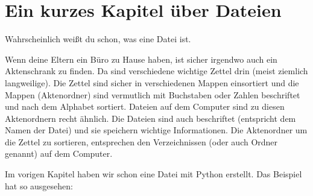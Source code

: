 

\chapter{Ein kurzes Kapitel über Dateien}\label{ch:ashortchapteraboutfiles}

Wahrscheinlich weißt du schon, was eine Datei ist.
\par
\noindent
Wenn deine Eltern ein Büro zu Hause haben, ist sicher irgendwo auch ein Aktenschrank zu finden. Da sind verschiedene wichtige Zettel drin (meist ziemlich langweilige). Die Zettel sind sicher in verschiedenen Mappen einsortiert und die Mappen (Aktenordner) sind vermutlich mit Buchstaben oder Zahlen beschriftet und nach dem Alphabet sortiert. Dateien auf dem Computer sind zu diesen Aktenordnern recht ähnlich. Die Dateien sind auch beschriftet (entspricht dem Namen der Datei) und sie speichern wichtige Informationen. Die Aktenordner um die Zettel zu sortieren, entsprechen den Verzeichnissen (oder auch Ordner genannt) auf dem Computer.
\par
Im vorigen Kapitel haben wir schon eine Datei mit Python erstellt. Das Beispiel hat so ausgesehen:

